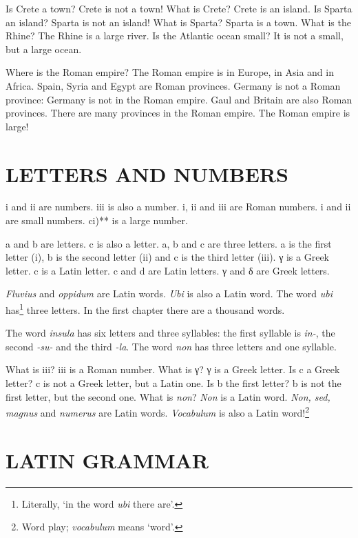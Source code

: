 Is Crete a town? Crete is not a town! What is Crete? Crete is an island. Is Sparta an island? Sparta is not an island! What is Sparta? Sparta is a town. What is the Rhine? The Rhine is a large river. Is the Atlantic ocean small? It is not a small, but a large ocean.

Where is the Roman empire? The Roman empire is in Europe, in Asia and in Africa. Spain, Syria and Egypt are Roman provinces. Germany is not a Roman province: Germany is not in the Roman empire. Gaul and Britain are also Roman provinces. There are many provinces in the Roman empire. The Roman empire is large!

\section[Letters and numbers]{LETTERS AND NUMBERS}
{\sc i} and {\sc ii} are numbers. {\sc iii} is also a number. {\sc i}, {\sc ii} and {\sc iii} are Roman numbers. {\sc i} and {\sc ii} are small numbers. {\sc ci)**} is a large number.

{\sc a} and {\sc b} are letters. {\sc c} is also a letter. {\sc a}, {\sc b} and {\sc c} are three letters. {\sc a} is the first letter ({\sc i}), {\sc b} is the second letter ({\sc ii}) and {\sc c} is the third letter ({\sc iii}). {\sc γ} is a Greek letter. {\sc c} is a Latin letter. {\sc c} and {\sc d} are Latin letters. {\sc γ} and {\sc δ} are Greek letters.

\emph{Fluvius} and \emph{oppidum} are Latin words. \emph{Ubi} is also a Latin word. The word \emph{ubi} has\footnote{Literally, `in the word \emph{ubi} there are'.} three letters. In the first chapter there are a thousand words.

The word \emph{insula} has six letters and three syllables: the first syllable is \emph{in-}, the second \emph{-su-} and the third \emph{-la}. The word \emph{non} has three letters and one syllable.

What is {\sc iii}? {\sc iii} is a Roman number. What is {\sc γ}? \smallc γ is a Greek letter. Is {\sc c} a Greek letter? {\sc c} is not a Greek letter, but a Latin one. Is {\sc b} the first letter? {\sc b} is not the first letter, but the second one. What is \emph{non}? \emph{Non} is a Latin word. \emph{Non, sed, magnus} and \emph{numerus} are Latin words. \emph{Vocabulum} is also a Latin word!\footnote{Word play; \emph{vocabulum} means `word'.}

\section[Grammar]{LATIN GRAMMAR}
